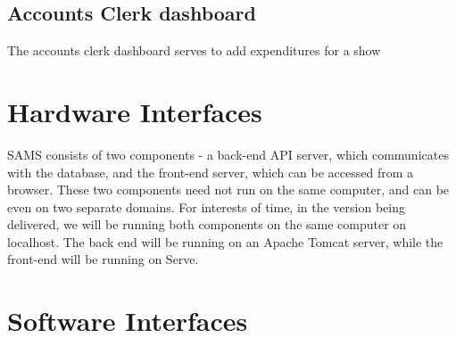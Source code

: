 \documentclass{scrreprt}
\begin{document}
\subsection{Accounts Clerk dashboard}
The accounts clerk dashboard serves to add expenditures for a show

\section{Hardware Interfaces}
SAMS consists of two components - a back-end API server, which communicates with the database, and the front-end server, which can be accessed from a browser. These two components need not run on the same computer, and can be even on two separate domains. For interests of time, in the version being delivered, we will be running both components on the same computer on localhost. The back end will be running on an Apache Tomcat server, while the front-end will be running on Serve.

\section{Software Interfaces}
\end{document}
